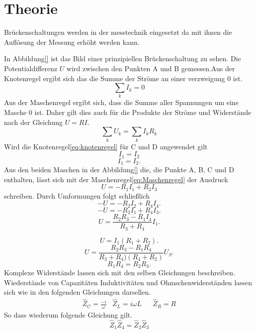 \section{Theorie}
\label{sec:Theorie}

\cite{sample}
Brückenschaltungen werden in der messtechnik eingesetzt da mit ihnen die Auflösung
der Messung erhöht werden kann.

In Abbildung\ref{} ist das Bild einer prinzipiellen Brückenschaltung zu sehen.
Die Potentialdifferenz $U$ wird zwischen den Punkten A und B gemessen.Aus der
Knotenregel ergibt sich das die Summe der Ströme an einer verzweigung $0$ ist.
\begin{equation}
  \sum \limits_{k} I_k= 0
  \label{eq:knotenregel}
\end{equation}
Aus der Maschenregel ergibt sich, dass die Summe aller Spannungen um eine Masche
$0$ ist. Daher gilt dies auch für die Produkte der Ströme und Widerstände nach
der Gleichung $U=RI$.
\begin{equation}
  \sum \limits_{k} U_k=  \sum \limits_{k} I_k R_k
  \label{eq:Maschenregel}
\end{equation}
Wird die Knotenregel\eqref{eq:knotenregel} für C und D angewendet gilt
\begin{equation}
  I_1=I_2
\end{equation}
\begin{equation}
  I_1=I_2    .
\end{equation}
Aus den beiden Maschen in der Abbildung\ref{} die, die Punkte A, B, C und D enthalten,
lässt sich mit der Maschenregel\eqref{eq:Maschenregel} der Ausdruck
\begin{equation}
  U=-R_1 I_1 + R_3 I_3
\end{equation}
schreiben. Durch Umformungen folgt schließlich
\begin{equation}
  -U=-R_2 I_2 + R_4 I_4   .
\end{equation}
\begin{equation}
  -U=-R_2 I_1 + R_4 I_3   .
\end{equation}
\begin{equation}
  U=\frac{R_2 R_3 - R_1 I_4}{R_3 + R_4}I_1   .
\end{equation}

\begin{equation}
  U=I_1 (R_1 + R_2)   .
\end{equation}
\begin{equation}
  U=\frac{R_2 R_3 - R_1 R_4}{R_3 + R_4)(R_4 + R_2) }U_S   .
\end{equation}
\begin{equation}
  R_1 R_4 =R_2 R_3   .
  \label{eq:Widerstand}
\end{equation}
Komplexe Widerstände lassen sich mit den selben Gleichungen beschreiben.
Wiederstände von Capazitäten Induktivitäten und Ohmschenwiderständen lassen sich
wie in den folgenden Gleichungen darsellen.
\begin{align}
&\hat{Z}_C = \frac{-i}{\omega}  &  \hat{Z}_L=i\omega L & & \hat{Z}_R = R &
\end{align}
So dass wiederum folgende Gleichung gilt.
\begin{equation}
\hat{Z}_1\hat{Z}_4=\hat{Z}_2\hat{Z}_3
\end{equation}
